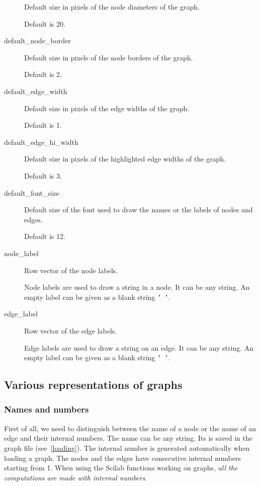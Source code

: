 \documentclass[11pt]{article}
\begin{document}
\begin{description}
Default size in pixels of the node diameters of the graph.

Default is 20.

  \item[default\_node\_border]

Default size in pixels of the node borders of the graph.

Default is 2.

  \item[default\_edge\_width]

Default size in pixels of the edge widths of the graph.

Default is 1.

  \item[default\_edge\_hi\_width]

Default size in pixels of the highlighted edge widths of the graph.

Default is 3.

  \item[default\_font\_size]

Default size of the font used to draw the names or the labels of nodes
and edges.

Default is 12.

  \item[node\_label]

Row vector of the node labels.

Node labels are used to draw a string in a node. It can be any string.
An empty label can be given as a blank string \texttt{' '}.

  \item[edge\_label]

Row vector of the edge labels.

Edge labels are used to draw a string on an edge. It can be any string.
An empty label can be given as a blank string \texttt{' '}.

\end{description}

\subsection{Various representations of graphs}\label{representation}

\subsubsection{Names and numbers}\label{number}

First of all, we need to distinguish between the name of a node or the
name of an
edge and their internal numbers. 
The name can be any string. Its is saved
in the graph file (see~\ref{loading}).
The internal
number is generated automatically when loading a graph. The nodes and
the edges have 
consecutive internal numbers starting from 1. 
When using the Scilab functions working on graphs, \emph{all the
computations are made with internal numbers}.
\end{document}
